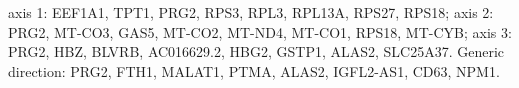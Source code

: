 axis 1: EEF1A1, TPT1, PRG2, RPS3, RPL3, RPL13A, RPS27, RPS18; axis 2: PRG2, MT-CO3, GAS5, MT-CO2, MT-ND4, MT-CO1, RPS18, MT-CYB; axis 3: PRG2, HBZ, BLVRB, AC016629.2, HBG2, GSTP1, ALAS2, SLC25A37. Generic direction: PRG2, FTH1, MALAT1, PTMA, ALAS2, IGFL2-AS1, CD63, NPM1.